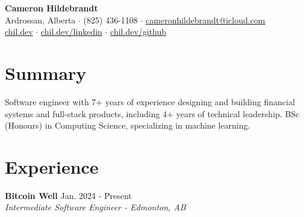 \documentclass[10pt,letterpaper]{article}
\newcommand{\resumeHeading}[3]{
    \textbf{#1} \hfill #3\\
    \textit{#2}
}
\begin{document}

\begin{center}
    {\LARGE\bfseries Cameron Hildebrandt}\\[3pt]
    Ardrossan, Alberta
    \enspace$\cdot$\enspace
    (825) 436-1108
    \enspace$\cdot$\enspace
    \href{mailto:cameronhildebrandt@icloud.com}{cameronhildebrandt@icloud.com}
    \\[2pt]
    \href{https://chil.dev}{chil.dev}
    \enspace$\cdot$\enspace
    \href{https://chil.dev/linkedin}{chil.dev/linkedin}
    \enspace$\cdot$\enspace
    \href{https://chil.dev/github}{chil.dev/github}
\end{center}


\section{Summary}

Software engineer with 7+ years of experience designing and building
financial systems and full-stack products, including 4+ years of
technical leadership. BSc (Honours) in Computing Science, specializing
in machine learning.


\section{Experience}

\resumeHeading
{Bitcoin Well}
{Intermediate Software Engineer - Edmonton, AB}
{Jan. 2024 - Present}
\end{document}
